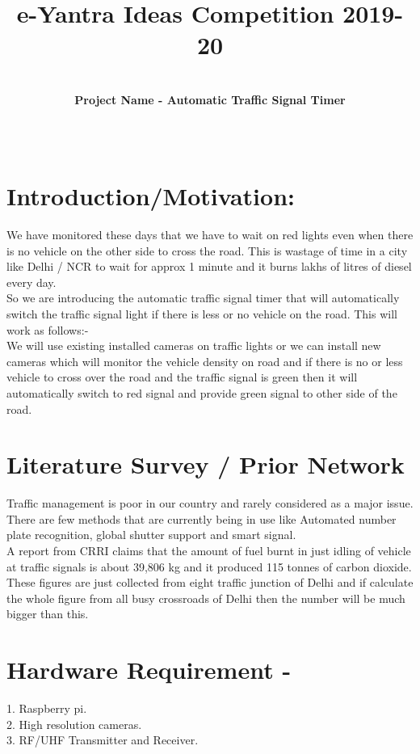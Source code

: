 \documentclass[]{article}
\title{%
	e-Yantra Ideas Competition 2019-20
	\\
	}
\author{
\\
\textbf{Project Name - Automatic Traffic Signal Timer}}
\date{\ }
\begin{document}
\maketitle



\section*{Introduction/Motivation:}
We have monitored these days that we have to wait on red lights even when there is no vehicle on the other side to cross the road. This is wastage of time in a city like Delhi / NCR to wait for approx 1 minute and it burns lakhs of litres of diesel every day.
\\
So we are introducing the automatic traffic signal timer that will automatically switch the traffic signal light if there is less or no vehicle on the road. This will work as follows:-
\\
We will use existing installed cameras on traffic lights or we can install new cameras which will monitor the vehicle density on road and if there is no or less vehicle to cross over the road and the traffic signal is green then it will automatically switch to red signal and provide green signal to other side of the road.

\section*{Literature Survey / Prior Network}
Traffic management is poor in our country and rarely considered as a major issue. There are few methods that are currently being in use like Automated number plate recognition, global shutter support and smart signal.
\\
A report from CRRI claims that the amount of fuel burnt in just idling of vehicle at traffic signals is about 39,806 kg and it produced 115 tonnes of carbon dioxide. These figures are just collected from eight traffic junction of Delhi and if calculate the whole figure from all busy crossroads of Delhi then the number will be much bigger than this.

\section*{Hardware Requirement - }
1. Raspberry pi.
\\
2. High resolution cameras.
\\
3. RF/UHF Transmitter and Receiver.
\end{document}
